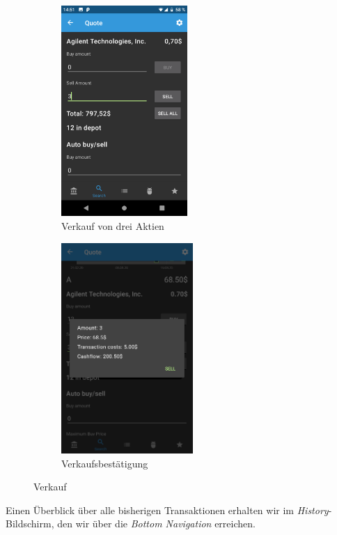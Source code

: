 \documentclass[a4paper]{article}
\begin{document}
\begin{figure}[H]
	\begin{subfigure}{.5\textwidth}
		\centering
		\includegraphics[height=8cm,keepaspectratio]{./images/demo/sell.png}
		\caption{Verkauf von drei Aktien}
		\label{fig:demo:sell_a_three}
	\end{subfigure}
	\begin{subfigure}{.5\textwidth}
		\centering
		\includegraphics[height=8cm,keepaspectratio]{./images/demo/sell_a_confirmation.png}
		\caption{Verkaufsbestätigung}
		\label{fig:demo:sell_a_confirmation}
	\end{subfigure}
	\caption{Verkauf}
	\label{fig:demo:sell_a}
\end{figure}

Einen Überblick über alle bisherigen Transaktionen erhalten wir im \textit{History}-Bildschirm, den wir über die \textit{Bottom Navigation} erreichen.
\end{document}

